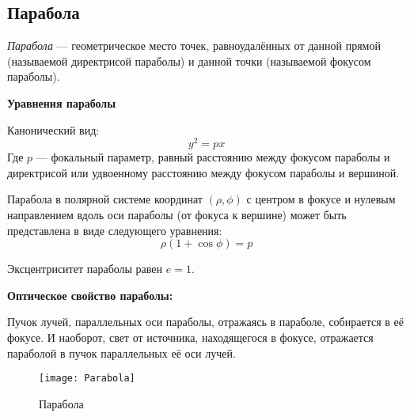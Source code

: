 \subsection{Парабола}

\textsl{Парабола} --- геометрическое место точек, равноудалённых от данной прямой (называемой директрисой параболы) и данной точки (называемой фокусом параболы).

\textbf{Уравнения параболы}

Канонический вид:
\begin{equation}
y^2=px
\end{equation}
Где $p$ --- фокальный параметр, равный расстоянию между фокусом параболы и директрисой или удвоенному расстоянию между фокусом параболы и вершиной.

Парабола в полярной системе координат $(\rho,\phi)$ с центром в фокусе и нулевым направлением вдоль оси параболы (от фокуса к вершине) может быть представлена в виде следующего уравнения:
\begin{equation}
\rho(1+\cos\phi)=p
\end{equation}

Эксцентриситет параболы равен $e=1$.

\textbf{Оптическое свойство параболы:}

Пучок лучей, параллельных оси параболы, отражаясь в параболе, собирается в её фокусе. И наоборот, свет от источника, находящегося в фокусе, отражается параболой в пучок параллельных её оси лучей.
\begin{figure}[h!]
\centering
\texttt{[image: Parabola]}
\caption{Парабола \label{pic:the-pic}}
\end{figure}
